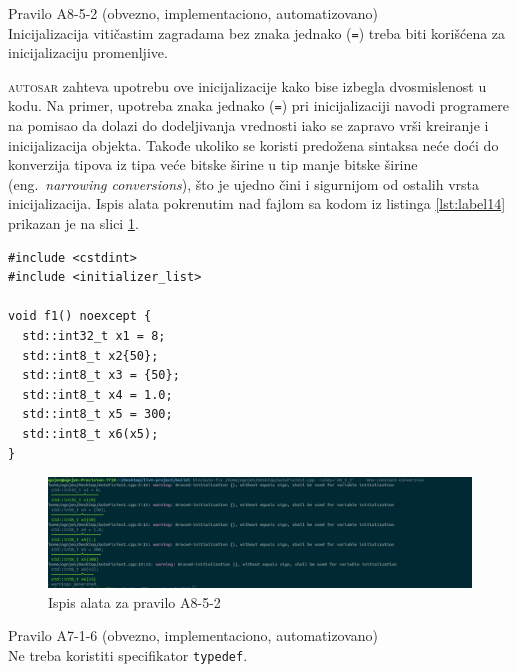 \documentclass[12pt,oneside]{memoir}
\begin{document}
\begin{primer}
Pravilo A8-5-2 (obvezno, implementaciono, automatizovano) \\
Inicijalizacija viti\v{c}astim zagradama bez znaka jednako (\texttt{=}) treba biti kori\v{s}\'{c}ena za inicijalizaciju promenljive.
\end{primer}

\textsc{autosar} zahteva upotrebu ove inicijalizacije kako bise izbegla dvosmislenost u kodu. Na primer, upotreba znaka jednako (\texttt{=}) pri
inicijalizaciji navodi programere na pomisao da dolazi do dodeljivanja vrednosti iako se zapravo vr\v{s}i kreiranje i inicijalizacija objekta.
Takođe ukoliko se koristi predo\v{z}ena sintaksa ne\'{c}e do\'{c}i do konverzija tipova iz tipa ve\'{c}e bitske \v{s}irine u tip manje bitske \v{s}irine (eng.~\textit{narrowing conversions}),
\v{s}to je ujedno \v{c}ini i sigurnijom od ostalih vrsta inicijalizacija. Ispis alata pokrenutim nad fajlom sa kodom iz listinga \ref{lst:label14} prikazan je na slici \ref{fig:A8-5-2}. \\

\begin{lstlisting}[style=customc, caption={Primer koda koji nije napisan u skladu sa pravilom A8-5-2}, label=lst:label14, captionpos=b]
#include <cstdint>
#include <initializer_list>

void f1() noexcept {
  std::int32_t x1 = 8;
  std::int8_t x2{50};
  std::int8_t x3 = {50};
  std::int8_t x4 = 1.0;
  std::int8_t x5 = 300;
  std::int8_t x6(x5);
}
\end{lstlisting}

\begin{figure}[!h]
\begin{center}
\includegraphics[scale=0.3]{A8-5-2.png}
\end{center}
\caption{Ispis alata za pravilo A8-5-2}
\label{fig:A8-5-2}
\end{figure}

\begin{primer}
Pravilo A7-1-6 (obvezno, implementaciono, automatizovano) \\
Ne treba koristiti specifikator \texttt{typedef}. 
\end{primer}
\end{document}
